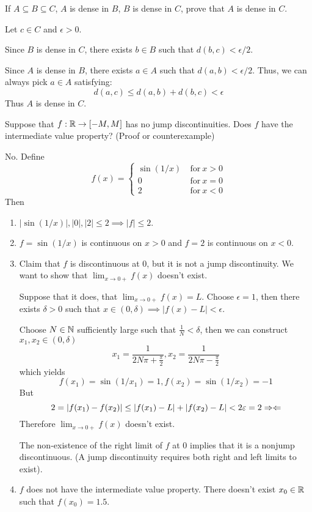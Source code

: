 \documentclass[a4paper, 12pt]{article}
\begin{document}
\begin{problem} 
If $A \subseteq B \subseteq C$, $A$ is dense in $B$, $B$ is dense in $C$, prove that $A$ is dense in $C$.
\end{problem}
\begin{solution}
    Let $c \in C$ and $\epsilon > 0$.

    Since $B$ is dense in $C$, there exists $b \in B$ such that $d(b, c) < \epsilon/2$.

    Since $A$ is dense in $B$, there exists $a \in A$ such that $d(a, b) < \epsilon / 2$. Thus, we can always pick $a \in A$ satisfying:
    \[
        d(a, c) \leq d(a, b) + d(b, c) < \epsilon
    \]
    Thus $A$ is dense in $C$.
\end{solution}
\begin{problem} 
Suppose that $f: \mathbb{R} \to [-M, M]$ has no jump discontinuities. Does $f$ have the intermediate value property? (Proof or counterexample)
\end{problem}
\begin{solution}
    No. Define \[
        f(x) = \begin{cases}
            \sin(1/x) & \:\text{for}\: x > 0 \\
            0         & \:\text{for}\: x = 0 \\
            2         & \:\text{for}\: x < 0
        \end{cases}
    \]
    Then \begin{enumerate}
        \item $|\sin(1/x)|, |0|, |2| \leq 2 \implies |f| \leq 2$.
        \item $f = \sin(1/x)$ is continuous on $ x > 0$ and $f = 2$ is continuous on $x < 0$.
        \item Claim that $f$ is discontinuous at 0, but it is not a jump discontinuity. We want to show that $\lim_{x \to 0+} f(x)$ doesn't exist.

              Suppose that it does, that $\lim_{x \to 0+} f(x) = L$. Choose $\epsilon = 1$, then there exists $\delta > 0$ such that $x \in (0, \delta) \implies |f(x) - L| < \epsilon$.

              Choose $N \in \mathbb{N}$ sufficiently large such that $\frac{1}{N} < \delta$, then we can construct $x_1, x_2 \in (0, \delta)$ \[
                  x_1 = \frac{1}{2N\pi + \frac{\pi}{2}}, x_2 = \frac{1}{2N\pi - \frac{\pi}{2}}
              \]
              which yields \[
                  f(x_1) = \sin(1/x_1) = 1, f(x_2) =  \sin(1/x_2) = -1
              \]
              But \[
                  2 = |f(x_1) - f(x_2)| \leq |f(x_1) - L| + |f(x_2) - L| < 2\varepsilon = 2 \Rightarrow\Leftarrow
              \]
              Therefore $\lim_{x \to 0+}f(x)$ doesn't exist.

              The non-existence of the right limit of $f$ at 0 implies that it is a nonjump discontinuous. (A jump discontinuity requires both right and left limits to exist).
        \item $f$ does not have the intermediate value property. There doesn't exist $x_0 \in \mathbb{R}$ such that $f(x_0) = 1.5$.
    \end{enumerate}
\end{solution}
\end{document}
